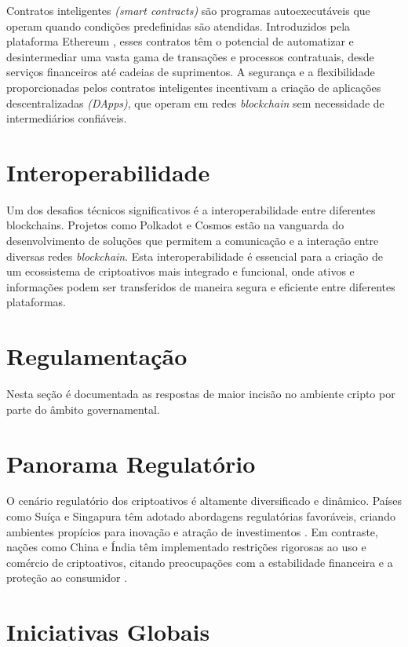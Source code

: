 Contratos inteligentes \textit{(smart contracts)} são programas autoexecutáveis que operam quando condições predefinidas são atendidas. Introduzidos pela plataforma Ethereum \cite{buterin2013ethereum}, esses contratos têm o potencial de automatizar e desintermediar uma vasta gama de transações e processos contratuais, desde serviços financeiros até cadeias de suprimentos. A segurança e a flexibilidade proporcionadas pelos contratos inteligentes incentivam a criação de aplicações descentralizadas \textit{(DApps)}, que operam em redes \textit{blockchain} sem necessidade de intermediários confiáveis.

\section*{Interoperabilidade}

Um dos desafios técnicos significativos é a interoperabilidade entre diferentes blockchains. Projetos como Polkadot \cite{wood2016polkadot} e Cosmos \cite{kwon2016cosmos} estão na vanguarda do desenvolvimento de soluções que permitem a comunicação e a interação entre diversas redes \textit{blockchain}. Esta interoperabilidade é essencial para a criação de um ecossistema de criptoativos mais integrado e funcional, onde ativos e informações podem ser transferidos de maneira segura e eficiente entre diferentes plataformas.

\section{Regulamentação}

Nesta seção é documentada as respostas de maior incisão no ambiente cripto por parte do âmbito governamental. 

\section*{Panorama Regulatório}

O cenário regulatório dos criptoativos é altamente diversificado e dinâmico. Países como Suíça e Singapura têm adotado abordagens regulatórias favoráveis, criando ambientes propícios para inovação e atração de investimentos \cite{zohar2015bitcoin}. Em contraste, nações como China e Índia têm implementado restrições rigorosas ao uso e comércio de criptoativos, citando preocupações com a estabilidade financeira e a proteção ao consumidor \cite{auer2018regulating}.

\section*{Iniciativas Globais}

